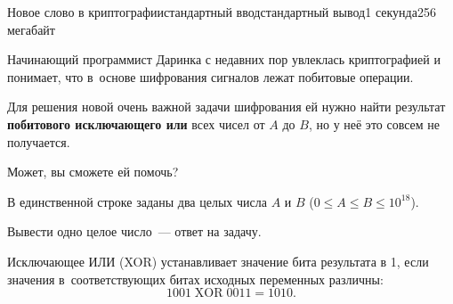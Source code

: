 \begin{problem}{Новое слово в криптографии}{стандартный ввод}{стандартный вывод}{1 секунда}{256 мегабайт}

Начинающий программист Даринка с недавних пор увлеклась криптографией и понимает, что в~основе шифрования сигналов лежат побитовые операции. 

Для решения новой очень важной задачи шифрования ей нужно найти результат \textbf{побитового исключающего или} всех чисел от $A$ до $B$, но у неё это совсем не получается.

Может, вы сможете ей помочь?

\InputFile
В единственной строке заданы два целых числа $A$ и $B$ ($0 \leq A \leq B \leq 10^{18}$).

\OutputFile
Вывести одно целое число~--- ответ на задачу.

\Examples

\begin{example}
%
%
\end{example}

\Note
Исключающее ИЛИ (XOR) устанавливает значение бита результата в 1, если значения в~соответствующих битах исходных переменных различны:
$$1001 \mathop{\mathrm{XOR}} 0011 = 1010.$$

\end{problem}

